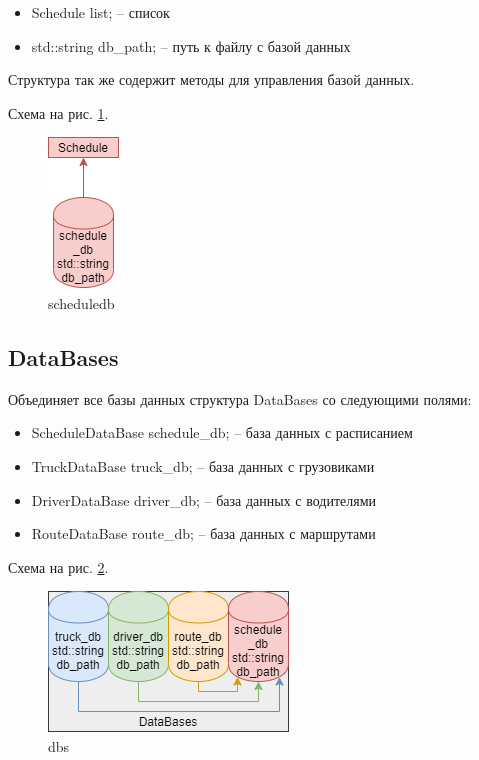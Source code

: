 \begin{itemize}
    \item Schedule list{}; -- список
    \item std::string db\_path{}; -- путь к файлу с базой данных
\end{itemize}

Структура так же содержит методы для управления базой данных.

Схема на рис. \ref{schedule_db}.

\begin{figure}[hpt!]
    \centering
    \includegraphics[width=0.2\linewidth]{photo/schedule_db}
    \caption{scheduledb}
    \label{schedule_db}
\end{figure}

\subsection{DataBases}

Объединяет все базы данных структура DataBases со следующими полями: 

\begin{itemize}
    \item ScheduleDataBase schedule\_db; -- база данных с расписанием
    \item TruckDataBase truck\_db; -- база данных с грузовиками
    \item DriverDataBase driver\_db; -- база данных с водителями
    \item RouteDataBase route\_db; -- база данных с маршрутами
\end{itemize}

Схема на рис. \ref{dbs}.

\begin{figure}[hpt!]
    \centering
    \includegraphics[width=0.4\linewidth]{photo/dbs}
    \caption{dbs}
    \label{dbs}
\end{figure}

